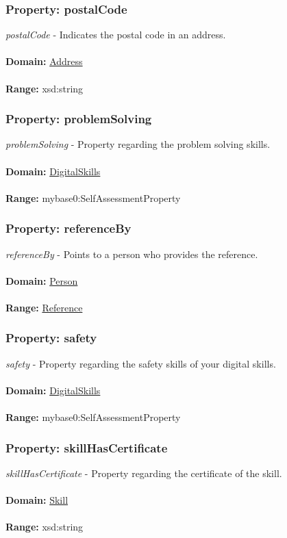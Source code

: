 \documentclass[a4paper,12pt]{article}
\numberwithin{equation}{section}
\begin{document}
\subsubsection{Property: postalCode}\hypertarget{postalCode}{}
\textit{postalCode} - Indicates the postal code in an address.
\\\\
\textbf{Domain:} \hyperlink{Address}{Address} 
\\\\
\textbf{Range:}  xsd:string

\subsubsection{Property: problemSolving}\hypertarget{problemSolving}{}
\textit{problemSolving} - Property regarding the problem solving skills.
\\\\
\textbf{Domain:} \hyperlink{DigitalSkills}{DigitalSkills} 
\\\\
\textbf{Range:}  mybase0:SelfAssessmentProperty

\subsubsection{Property: referenceBy}\hypertarget{referenceBy}{}
\textit{referenceBy} - Points to a person who provides the reference.
\\\\
\textbf{Domain:} \hyperlink{Person}{Person} 
\\\\
\textbf{Range:}  \hyperlink{Reference}{Reference} 

\subsubsection{Property: safety}\hypertarget{safety}{}
\textit{safety} - Property regarding the safety skills of your digital skills.
\\\\
\textbf{Domain:} \hyperlink{DigitalSkills}{DigitalSkills} 
\\\\
\textbf{Range:}  mybase0:SelfAssessmentProperty

\subsubsection{Property: skillHasCertificate}\hypertarget{skillHasCertificate}{}
\textit{skillHasCertificate} - Property regarding the certificate of the skill.
\\\\
\textbf{Domain:} \hyperlink{Skill}{Skill} 
\\\\
\textbf{Range:}  xsd:string
\end{document}
